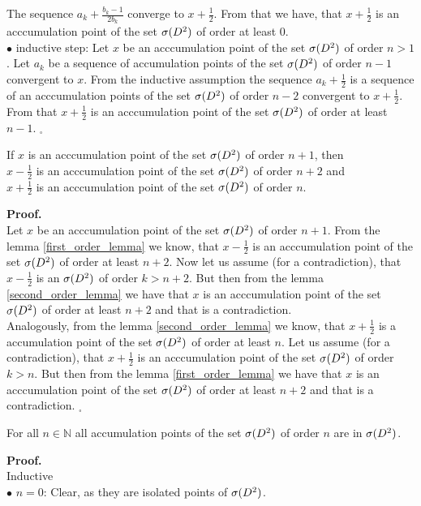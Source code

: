 The sequence $a_k + \frac{b_k-1}{2b_k}$ converge to $x+\frac{1}{2}$. From that we have, that 
$x + \frac{1}{2}$ is an acccumulation point of the set ${\mathcal{\sigma}(D^2)}$ of order at least $0$. \\
$\bullet$ inductive step: Let $x$ be an acccumulation point of the set ${\mathcal{\sigma}(D^2)}$ of order $n > 1$. 
Let $a_k$ be a sequence of accumulation points of the set ${\mathcal{\sigma}(D^2)}$ of order $n-1$ convergent to $x$. 
From the inductive assumption the sequence $a_k + \frac{1}{2}$ is a sequence of an acccumulation
 points of the set ${\mathcal{\sigma}(D^2)}$ of order $n-2$ convergent to $x + \frac{1}{2}$. From that 
 $x + \frac{1}{2}$ is an acccumulation point of the set ${\mathcal{\sigma}(D^2)}$ of order at least $n-1$. $_\square$ 
\begin{lemma}\label{third_order_lemma}
If $x$ is an acccumulation point of the set ${\mathcal{\sigma}(D^2)}$ of order $n+1$, then \\
$x - \frac{1}{2}$ is an acccumulation point of the set ${\mathcal{\sigma}(D^2)}$ of order $n+2$ and \\
$x + \frac{1}{2}$ is an acccumulation point of the set ${\mathcal{\sigma}(D^2)}$ of order $n$. 
\end{lemma}
\noindent\textbf{Proof.} \\
Let $x$ be an acccumulation point of the set ${\mathcal{\sigma}(D^2)}$ of order $n+1$. From the lemma 
 \ref{first_order_lemma} we know, that $x - \frac{1}{2}$ is an acccumulation point of the set 
 ${\mathcal{\sigma}(D^2)}$ of order at least $n+2$. Now let us assume (for a contradiction), that $x - \frac{1}{2}$ 
 is an \apots ${\mathcal{\sigma}(D^2)}$ of order $k>n+2$. But then from the lemma \ref{second_order_lemma} 
 we have that $x$ is an acccumulation point of the set ${\mathcal{\sigma}(D^2)}$ of order at least $n+2$ and that 
 is a contradiction. \\
Analogously, from the lemma \ref{second_order_lemma} we know, that $x + \frac{1}{2}$ is a 
accumulation point of the set ${\mathcal{\sigma}(D^2)}$ of order at least $n$. Let us assume (for a contradiction), 
that $x+ \frac{1}{2}$ is an acccumulation point of the set ${\mathcal{\sigma}(D^2)}$ of order $k>n$. But then 
from the lemma \ref{first_order_lemma} we have that $x$ is an acccumulation point of the set ${\mathcal{\sigma}(D^2)}$ 
of order at least $n+2$ and that is a contradiction. $_\square$ 
\begin{lemma}\label{accumulations_points_of_the_set}
For all $n \in \mathbb{N}$ all accumulation points of the set ${\mathcal{\sigma}(D^2)}$ of order $n$ are in ${\mathcal{\sigma}(D^2)}$.
\end{lemma}
\noindent\textbf{Proof.} \\
Inductive \\
$\bullet$ $n=0$: Clear, as they are isolated points of ${\mathcal{\sigma}(D^2)}$. \\
